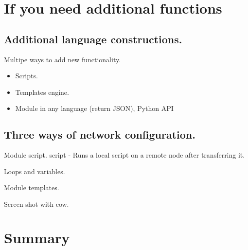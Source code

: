 \documentclass[16pt]{beamer}
\begin{document}
\section{If you need additional functions}
\subsection {Additional language constructions.}
\begin{frame}{Multipe ways to add new functionality.}
  \begin{itemize}
  \item
    Scripts.
  \item
    Templates engine.
  \item
    Module in any language (return JSON), Python API
  \end{itemize}
\end{frame}

\subsection {Three ways of network configuration.}

\begin{frame}{Module script.}
  script - Runs a local script on a remote node after transferring it.
  
\end{frame}

\begin{frame}{Loops and variables.}
  
  
\end{frame}

\begin{frame}{Module templates.}
  
  
  
\end{frame}

\begin{frame}{Screen shot with cow.}
\end{frame}



\section*{Summary}
\end{document}
